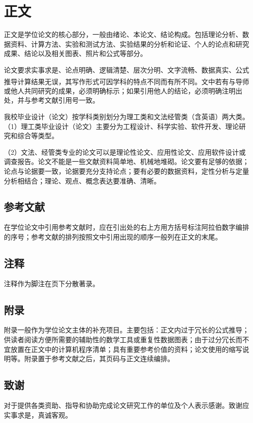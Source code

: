 \documentclass{bucthesis}
\begin{document}
\chapter{正文}{\par
	正文是学位论文的核心部分，一般由绪论、本论文、结论构成。包括理论分析、数据资料、计算方法、实验和测试方法、实验结果的分析和论证、个人的论点和研究成果、结论以及相关图表、照片和公式等部分。\par
	论文要求实事求是、论点明确、逻辑清楚、层次分明、文字流畅、数据真实、公式推导计算结果无误，其写作形式可因学科的特点不同而有所不同\textsuperscript{\cite{kocher99}}。文中若有与导师或他人共同研究的成果，必须明确标示；如果引用他人的结论，必须明确注明出处，并与参考文献引用号一致\cite{Krasnogor2004e}。\par
	我校毕业设计（论文）按学科类别划分为理工类和文法经管类（含英语）两大类。 （1）理工类毕业设计（论文）主要分为工程设计、科学实验、软件开发、理论研究和综合等类型。\par
	（2）文法、经管类专业的论文可以是理论性论文、应用性论文、应用软件设计或调查报告。论文不能是一些文献资料简单地、机械地堆砌。论文要有足够的依据；论点与论据要一致，论据要充分支持论点；要有必要的数据资料，定性分析与定量分析相结合；理论、观点、概念表达要准确、清晰。\par}
\section{参考文献}{\par
	在学位论文中引用参考文献时，应在引出处的右上方用方括号标注阿拉伯数字编排的序号；参考文献的排列按照文中引用出现的顺序一般列在正文的末尾。
\par}
\section{注释}{\par 注释作为脚注在页下分散著录。\par}
\section{附录}{\par
	附录一般作为学位论文主体的补充项目。主要包括：正文内过于冗长的公式推导；供读者阅读方便所需要的辅助性的数学工具或重复性数据图表；由于过分冗长而不宜放置在正文中的计算机程序清单；具有重要参考价值的资料；论文使用的缩写说明等。附录置于参考文献之后，其页码与正文连续编排。
\par}
\section{致谢}{\par
	对于提供各类资助、指导和协助完成论文研究工作的单位及个人表示感谢。致谢应实事求是，真诚客观。\par}
\end{document}
